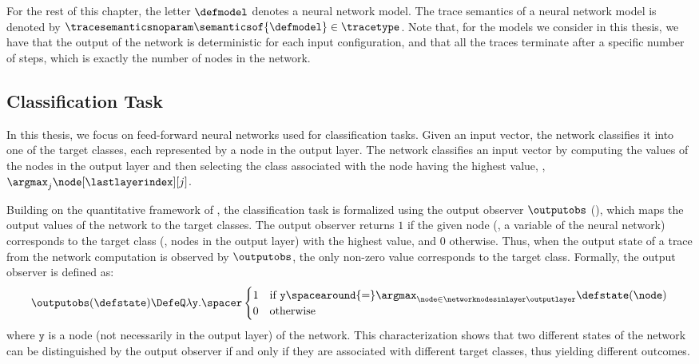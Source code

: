 For the rest of this chapter, the letter $\defmodel$ denotes a neural network model. The trace semantics of a neural network model is denoted by $\tracesemanticsnoparam\semanticsof{\defmodel}\in\tracetype$.
Note that, for the models we consider in this thesis, we have that the output of the network is deterministic for each input configuration, and that all the traces terminate after a specific number of steps, which is exactly the number of nodes in the network.

\subsection{Classification Task}

In this thesis, we focus on feed-forward neural networks used for classification tasks. Given an input vector, the network classifies it into one of the target classes, each represented by a node in the output layer. The network classifies an input vector by computing the values of the nodes in the output layer and then selecting the class associated with the node having the highest value, \ie, $\argmax_{j} \node[\lastlayerindex][j]$.

Building on the quantitative framework of , the classification task is formalized using the output observer $\outputobs$ (), which maps the output values of the network to the target classes. The output observer returns $1$ if the given node (\ie, a variable of the neural network) corresponds to the target class (\ie, nodes in the output layer) with the highest value, and $0$ otherwise. Thus, when the output state of a trace from the network computation is observed by $\outputobs$, the only non-zero value corresponds to the target class. Formally, the output observer is defined as:
\begin{align*}
\outputobs(\defstate) \DefeQ \lambda \texttt{y}.\spacer
\begin{cases}
1 & \text{if } \texttt{y} \spacearound{=} \argmax_{\node \in\networknodesinlayer\outputlayer} \defstate(\node) \\
0 & \text{otherwise}
\end{cases}
\end{align*}
where $\texttt{y}$ is a node (not necessarily in the output layer) of the network.
This characterization shows that two different states of the network can be distinguished by the output observer if and only if they are associated with different target classes, thus yielding different outcomes.

